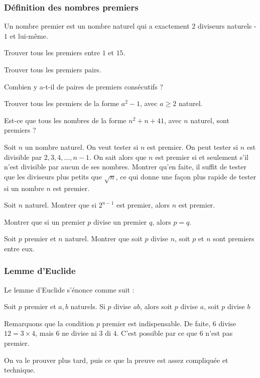 \subsubsection{Définition des nombres premiers}
Un nombre premier est un nombre naturel qui a exactement \(2\) diviseurs naturels - \(1\) et lui-même.
\endgroup

\exo
Trouver tous les premiers entre \(1\) et \(15\).

\exo
Trouver tous les premiers pairs.

\exo
Combien y a-t-il de paires de premiers consécutifs ?

\exo
Trouver tous les premiers de la forme \(a^2 - 1\), avec \(a\geqslant2\) naturel.

\exo
Est-ce que tous les nombres de la forme \(n^2 + n + 41\), avec \(n\) naturel, sont premiers ?

\exo
Soit \(n\) un nombre naturel. On veut tester si \(n\) est premier.
On peut tester si \(n\) est divisible par \(2, 3, 4, \ldots, n-1\). On sait alors que \(n\) est premier si et seulement s’il n'est divisible par aucun de ses nombres. Montrer qu'en faite, il suffit de tester que les diviseurs plus petits que \(\sqrt{n}\), ce qui donne une façon plus rapide de tester si un nombre \(n\) est premier.

\exo
Soit \(n\) naturel. Montrer que si \(2^{n-1}\) est premier, alors \(n\) est premier.

\exo
Montrer que si un premier \(p\) divise un premier \(q\), alors \(p=q\).

\exo
Soit \(p\) premier et \(n\) naturel. Montrer que soit \(p\) divise \(n\), soit \(p\) et \(n\) sont premiers entre eux.

\subsubsection{Lemme d'Euclide}
Le lemme d'Euclide s'énonce comme suit :



Soit \(p\) premier et \(a, b\) naturels. Si \(p\) divise \(ab\), alors soit \(p\) divise \(a\), soit \(p\) divise \(b\)

\endgroup

Remarquons que la condition \(p\) premier est indispensable. De faite, \(6\) divise \(12 = 3 \times 4\), mais \(6\) ne divise ni \(3\) di \(4\). C'est possible par ce que \(6\) n'est pas premier.

On va le prouver plus tard, puis ce que la preuve est assez compliquée et technique.

